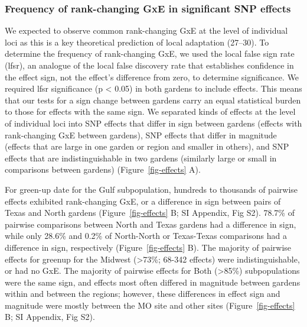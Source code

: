 \documentclass[
  9pt,
  twocolumn,
  twoside]{pnas-new}
\begin{document}
\subsubsection{Frequency of rank-changing GxE in significant SNP
effects}\label{frequency-of-rank-changing-gxe-in-significant-snp-effects}

We expected to observe common rank-changing GxE at the level of
individual loci as this is a key theoretical prediction of local
adaptation (27--30). To determine the frequency of rank-changing GxE, we
used the local false sign rate (lfsr), an analogue of the local false
discovery rate that establishes confidence in the effect sign, not the
effect's difference from zero, to determine significance. We required
lfsr significance (p \textless{} 0.05) in both gardens to include
effects. This means that our tests for a sign change between gardens
carry an equal statistical burden to those for effects with the same
sign. We separated kinds of effects at the level of individual loci into
SNP effects that differ in sign between gardens (effects with
rank-changing GxE between gardens), SNP effects that differ in magnitude
(effects that are large in one garden or region and smaller in others),
and SNP effects that are indistinguishable in two gardens (similarly
large or small in comparisons between gardens) (Figure~\ref{fig-effects}
A).

For green-up date for the Gulf subpopulation, hundreds to thousands of
pairwise effects exhibited rank-changing GxE, or a difference in sign
between pairs of Texas and North gardens (Figure~\ref{fig-effects} B; SI
Appendix, Fig S2). 78.7\% of pairwise comparisons between North and
Texas gardens had a difference in sign, while only 28.6\% and 0.2\% of
North-North or Texas-Texas comparisons had a difference in sign,
respectively (Figure~\ref{fig-effects} B). The majority of pairwise
effects for greenup for the Midwest (\textgreater73\%; 68-342 effects)
were indistinguishable, or had no GxE. The majority of pairwise effects
for Both (\textgreater85\%) subpopulations were the same sign, and
effects most often differed in magnitude between gardens within and
between the regions; however, these differences in effect sign and
magnitude were mostly between the MO site and other sites
(Figure~\ref{fig-effects} B; SI Appendix, Fig S2).
\end{document}
